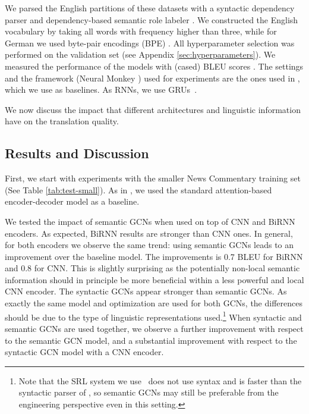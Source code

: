 \documentclass[11pt,a4paper]{article}
\begin{document}
We parsed the English partitions of these datasets with a syntactic dependency parser \cite{P16-1231} and dependency-based semantic role labeler \cite{marcheggiani-frolov-titov:2017:srl}.
We constructed the English vocabulary by taking all words with frequency higher than three, while for German we used byte-pair encodings (BPE) \cite{sennrich2016subword}.
All hyperparameter selection was performed on the validation set (see Appendix \ref{sec:hyperparameters}).
We measured the performance of the models with (cased) BLEU scores \cite{papineni2002bleu}.
The settings and the framework (Neural Monkey \cite{NeuralMonkey:2017}) used for experiments are the ones used in , which we use as baselines. As RNNs, we use GRUs~\cite{cho14emnlp}.

We now discuss the impact that different architectures and linguistic information have on the translation quality. 

\subsection{Results and Discussion}

First, we start with experiments with the smaller News Commentary training set (See Table \ref{tab:test-small}).  
As in , we used the standard attention-based encoder-decoder model as a baseline.

We tested the impact of semantic GCNs when used on top of CNN and BiRNN encoders. As expected, BiRNN results are stronger than CNN ones.
In general, for both encoders we observe the same trend: using semantic GCNs leads to an improvement over the baseline model. 
The improvements is 0.7 BLEU for BiRNN and 0.8 for CNN. 
This is slightly surprising as the potentially non-local semantic information should in principle be more beneficial within a less powerful and local CNN encoder. 
The syntactic GCNs  \cite{bastings-EtAl:2017:EMNLP2017} appear stronger than semantic GCNs. 
As exactly the same model and optimization are used for both GCNs, the differences should be due to the type of linguistic representations used.\footnote{Note that the SRL system we use~\cite{marcheggiani-frolov-titov:2017:srl} does not use syntax and is faster than the syntactic parser of , so semantic GCNs may still be preferable from the engineering perspective even in this setting.}
When syntactic and semantic GCNs are used together, we observe a further improvement with respect to the semantic GCN model, and a substantial improvement with respect to the syntactic GCN model with a CNN encoder.
\end{document}
